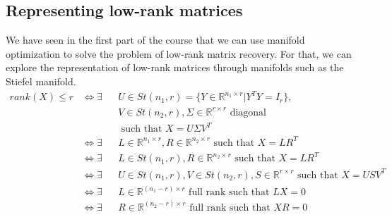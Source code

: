 \documentclass[12pt, openany]{report}
\newcommand{\R}{\mathbb{R}}
\theoremstyle{definition}
\begin{document}
\subsection{Representing low-rank matrices}
We have seen in the first part of the course that we can use manifold optimization to solve the problem of low-rank matrix recovery. For that, we can explore the representation of low-rank matrices through manifolds such as the Stiefel manifold.
\begin{equation}
	\begin{aligned}
		rank(X) \leq r &\Longleftrightarrow \exists &&U\in St(n_1,r) = \{Y \in \R^{n_1 \times r} | Y^T Y = I_r\},\\
		& &&V\in St(n_2,r), \Sigma \in \R^{r \times r} \text{ diagonal}\\
		& &&\text{ such that } X = U \Sigma V^T\\
		&\Longleftrightarrow \exists && L \in \R^{n_1 \times r}, R \in \R^{n_2 \times r} \text{ such that } X = LR^T\\
		&\Longleftrightarrow \exists &&L \in St(n_1,r), R \in \R^{n_2 \times r} \text{ such that } X = LR^T\\
		&\Longleftrightarrow \exists &&U \in St(n_1,r), V \in St(n_2,r), S\in \R^{r \times r} \text{ such that } X= USV^T\\
		&\Longleftrightarrow \exists &&L \in \R^{(n_1-r) \times r} \text{ full rank such that } LX = 0\\
		&\Longleftrightarrow \exists &&R \in \R^{(n_2-r) \times r} \text{ full rank such that } XR = 0
	\end{aligned}
\end{equation}
\end{document}
